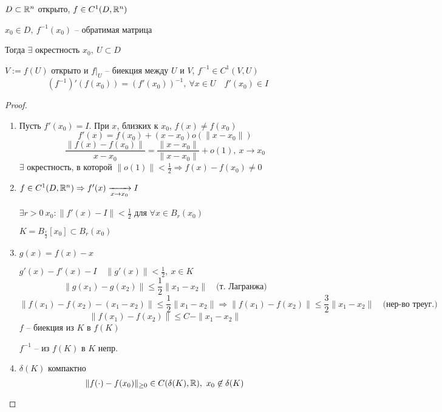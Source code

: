     \begin{theorem}
        $D \subset \mathbb{R}^n$ открыто, $f \in C^1(D, \mathbb{R}^n)$
        \par $x_0 \in D, \ f^{-1}(x_0)$ -- обратимая матрица
        \par Тогда $\exists$ окрестность $x_0, \> U \subset D$
        \par $V := f(U)$ открыто и $f\big|_U$ -- биекция между $U$ и $V$, $f^{-1} \in C^1(V, U)$
        \[
            (f^{-1})'(f(x_0)) = (f'(x_0))^{-1}, \ \forall x \in U \quad f'(x_0) \in I    
        \]
    \end{theorem}

    \begin{proof}
        $ $ \par
        \begin{enumerate}
            \item Пусть $f'(x_0) = I$. При $x$, близких к $x_0$, $f(x) \not= f(x_0)$
                \[
                    f'(x) = f(x_0) + (x-x_0) o(\|x-x_0\|)    
                \]
                \[
                    \frac{\|f(x)-f(x_0)\|}{x-x_0} = \frac{\|x-x_0\|}{\|x-x_0\|} + o(1), \ x \rightarrow x_0  
                \]
                $\exists$ окрестность, в которой $\|o(1)\| < \frac12 \Rightarrow f(x)-f(x_0) \not= 0$
            \item $f \in C^1(D, \mathbb{R}^n) \Rightarrow f'(x) \xrightarrow[x \rightarrow x_0]{} I$
                \par $\exists r > 0 \ x_0 : \|f'(x) - I\| < \frac12$ для $\forall x \in B_r(x_0)$
                \par $K = B_{\frac{r}{2}}[x_0] \subset B_r(x_0)$
            \item $g(x) = f(x) - x$
                \par $g'(x) - f'(x) - I \quad \|g'(x)\| < \frac12, \ x \in K$
                \[
                    \|g(x_1) - g(x_2)\| \le \frac12 \|x_1-x_2\| \quad \text{(т. Лагранжа)}
                \]
                \[
                    \|f(x_1) - f(x_2) - (x_1 - x_2)\| \le \frac12 \|x_1 - x_2\| \Rightarrow \|f(x_1) - f(x_2)\| \le \frac32 \|x_1 - x_2\| \quad \text{(нер-во треуг.)}   
                \]
                \[
                    \|f(x_1) - f(x_2)\| \le C - \|x_1 - x_2\|    
                \]
                $f$ -- биекция из $K$ в $f(K)$
                \par $f^{-1}$ -- из $f(K)$ в $K$ непр.
            \item $\delta(K)$ компактно
                \[
                    \|f(\cdot) - f(x_0)\|_{\ge 0} \in C(\delta(K), \mathbb{R}), \ x_0 \not\in \delta(K) 
\]
\end{enumerate}
\end{proof}
